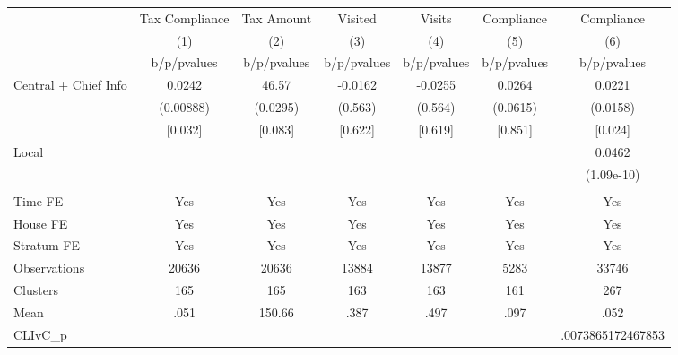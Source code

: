 {
\def\sym#1{\ifmmode^{#1}\else\(^{#1}\)\fi}
\begin{tabular}{l*{6}{c}}
\toprule
                &\multicolumn{1}{c}{Tax Compliance}&\multicolumn{1}{c}{Tax Amount}&\multicolumn{1}{c}{Visited}&\multicolumn{1}{c}{Visits}&\multicolumn{1}{c}{Compliance}&\multicolumn{1}{c}{Compliance}\\
                &\multicolumn{1}{c}{(1)}&\multicolumn{1}{c}{(2)}&\multicolumn{1}{c}{(3)}&\multicolumn{1}{c}{(4)}&\multicolumn{1}{c}{(5)}&\multicolumn{1}{c}{(6)}\\
                &b/p/pvalues&b/p/pvalues&b/p/pvalues&b/p/pvalues&b/p/pvalues&b/p/pvalues\\
\midrule
Central + Chief Info&   0.0242&    46.57&  -0.0162&  -0.0255&   0.0264&   0.0221\\
                &(0.00888)& (0.0295)&  (0.563)&  (0.564)& (0.0615)& (0.0158)\\
                &  [0.032]&  [0.083]&  [0.622]&  [0.619]&  [0.851]&  [0.024]\\
Local           &         &         &         &         &         &   0.0462\\
                &         &         &         &         &         &(1.09e-10)\\
                &         &         &         &         &         &         \\
Time FE         &      Yes&      Yes&      Yes&      Yes&      Yes&      Yes\\
House FE        &      Yes&      Yes&      Yes&      Yes&      Yes&      Yes\\
Stratum FE      &      Yes&      Yes&      Yes&      Yes&      Yes&      Yes\\
\midrule
Observations    &    20636&    20636&    13884&    13877&     5283&    33746\\
Clusters        &      165&      165&      163&      163&      161&      267\\
Mean            &     .051&   150.66&     .387&     .497&     .097&     .052\\
CLIvC\_p         &         &         &         &         &         &.0073865172467853\\
\bottomrule
\end{tabular}
}
